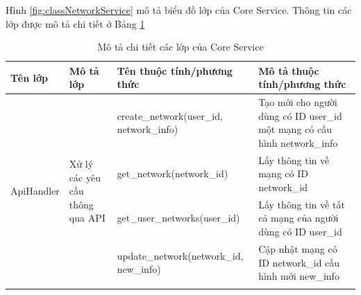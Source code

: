 \documentclass[../DoAn.tex]{subfiles}
\begin{document}
Hình \ref{fig:classNetworkService} mô tả biểu đồ lớp của Core Service. Thông tin các lớp được mô tả chi tiết ở Bảng \ref{tab:classCoreService}

\begin{longtable}{|p{}|p{}|p{}|p{}|}
    \caption{Mô tả chi tiết các lớp của Core Service}
    \label{tab:classCoreService}                                                                                                                                                                                                                                                                                       \\
    \hline
    Tên lớp                                      & Mô tả lớp                                                                        & Tên thuộc tính/phương thức                                                        & Mô tả thuộc tính/phương thức                                                                 \\ \hline
    \multirow[t]{11}{0.2\textwidth}{ApiHandler}  & \multirow[t]{11}{0.2\textwidth}{Xử lý các yêu cầu thông qua API}                 & \hspace{0pt}create\_network\hspace{0pt}(user\_id, network\_info)                  & Tạo mới cho người dùng có ID user\_id một mạng có cấu hình network\_info                     \\ \cline{3-4}
                                                 &                                                                                  & \hspace{0pt}get\_network\hspace{0pt}(network\_id)                                 & Lấy thông tin về mạng có ID network\_id                                                      \\ \cline{3-4}
                                                 &                                                                                  & \hspace{0pt}get\_user\_networks\hspace{0pt}(user\_id)                             & Lấy thông tin về tất cả mạng của người dùng có ID user\_id                                   \\ \hline
                                                 &                                                                                  & \hspace{0pt}update\_network\hspace{0pt}(network\_id, new\_info)                   & Cập nhật mạng có ID network\_id cấu hình mới new\_info                                       \\ \cline{3-4}

\end{longtable}
\end{document}

